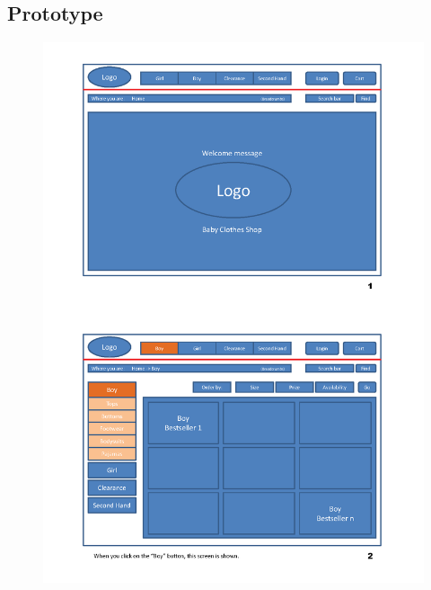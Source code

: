 \newpage

\subsection{Prototype}
\begin{figure}[h!]
\begin{center}
\includegraphics[scale=0.77]{Prototype/HCI_Prototype_2_1_1.png}
\end{center}
\end{figure}
\newpage


\newpage

